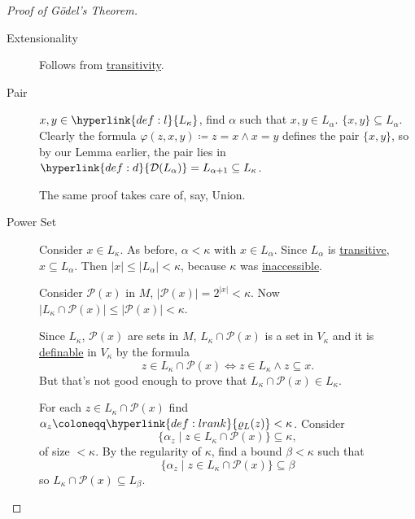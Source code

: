 \documentclass{article}
\newcommand{\1}{\mathbbm{1}}
\begin{document}
\begin{proof}[Proof of G\"odel's Theorem]\leavevmode
  \begin{description}
    \item [Extensionality] Follows from \hyperlink{def:transitive}{transitivity}.
    \item[Pair] $x,y \in \hyperlink{def:l}{L_\kappa}$, find $\alpha$ such that $x,y \in L_\alpha$. $\{x,y\} \subseteq L_\alpha$.
      Clearly the formula $\varphi(z,x,y) \coloneqq z=x \land x=y$ defines the pair $\{x,y\}$, so by our Lemma earlier, the pair lies in $\hyperlink{def:d}{\mathcal{D}(L_\alpha)} = L_{\alpha+1} \subseteq L_\kappa$.

      The same proof takes care of, say, Union.
    \item [Power Set] Consider $x \in L_\kappa$.
      As before, $\alpha < \kappa$ with $x \in L_\alpha$.
      Since $L_\alpha$ is \hyperlink{def:transitive}{transitive}, $x \subseteq L_\alpha$. Then $|x| \leq |L_\alpha| < \kappa$, because $\kappa$ was \hyperlink{def:inacc}{inaccessible}.

      Consider $\mathcal{P}(x)$ in $M$,
      $|\mathcal{P}(x)| = 2^{|x|} < \kappa.$
      Now $|L_\kappa \cap \mathcal{P}(x)| \leq |\mathcal{P}(x)| < \kappa$.

        Since $L_\kappa$, $\mathcal{P}(x)$ are sets in $M$, $L_\kappa \cap \mathcal{P}(x)$ is a set in $V_\kappa$ and it is \hyperlink{def:defsubs}{definable} in $V_\kappa$ by the formula
        \begin{equation*}
          z \in L_\kappa \cap \mathcal{P}(x) \iff z \in L_\kappa \land z \subseteq x.
        \end{equation*}
        But that's not good enough to prove that $L_\kappa \cap \mathcal{P}(x) \in L_\kappa$.

      For each $z \in L_\kappa \cap \mathcal{P}(x)$ find $\alpha_z \coloneqq \hyperlink{def:lrank}{\varrho_L(z)} < \kappa$.
      Consider
      \begin{equation*}
      \{\alpha_z \mid z \in L_\kappa \cap \mathcal{P}(x)\} \subseteq \kappa,
      \end{equation*}
      of size $<\kappa$.
      By the regularity of $\kappa$, find a bound $\beta < \kappa$ such that
      \begin{equation*}
        \{\alpha_z \mid z \in L_\kappa \cap \mathcal{P}(x) \} \subseteq \beta
      \end{equation*}
      so $L_\kappa \cap \mathcal{P}(x) \subseteq L_\beta$.


\end{description}
\end{proof}
\end{document}
